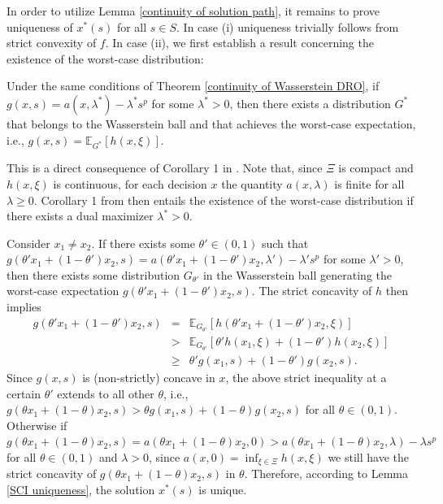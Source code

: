 \documentclass[mnsc,blindrev]{informs4} %
\begin{document}
In order to utilize Lemma \ref{continuity of solution path}, it remains to prove uniqueness of $x^*(s)$ for all $s\in S$. In case (i) uniqueness trivially follows from strict convexity of $f$. In case (ii), we first establish a result concerning the existence of the worst-case distribution:
\begin{lemma}\label{existence of worst-case distribution}
Under the same conditions of Theorem \ref{continuity of Wasserstein DRO}, if $g(x,s)=a(x,\lambda^*)-\lambda^* s^p$ for some $\lambda^*>0$, then there exists a distribution $G^*$ that belongs to the Wasserstein ball and that achieves the worst-case expectation, i.e., $g(x,s)=\mathbb E_{G^*}[h(x,\xi)]$.
\end{lemma}
This is a direct consequence of Corollary 1 in \cite{gao2016distributionally}. Note that, since $\Xi$ is compact and $h(x,\xi)$ is continuous, for each decision $x$ the quantity $a(x,\lambda)$ is finite for all $\lambda\geq 0$. Corollary 1 from \cite{gao2016distributionally} then entails the existence of the worst-case distribution if there exists a dual maximizer $\lambda^*>0$.\hfill\Halmos

Consider $x_1\neq x_2$. If there exists some $\theta'\in (0,1)$ such that $g(\theta' x_1+(1-\theta')x_2,s)= a(\theta' x_1+(1-\theta')x_2,\lambda')-\lambda's^p$ for some $\lambda'>0$, then there exists some distribution $G_{\theta'}$ in the Wasserstein ball generating the worst-case expectation $g(\theta' x_1+(1-\theta')x_2,s)$. The strict concavity of $h$ then implies
\begin{eqnarray*}
g(\theta' x_1+(1-\theta')x_2,s)&=&\mathbb E_{G_{\theta'}}[h(\theta' x_1+(1-\theta')x_2,\xi)]\\
&>&\mathbb E_{G_{\theta'}}[\theta' h(x_1,\xi)+(1-\theta')h(x_2,\xi)]\\
&\geq &\theta'g(x_1,s)+(1-\theta')g(x_2,s).
\end{eqnarray*}
Since $g(x,s)$ is (non-strictly) concave in $x$, the above strict inequality at a certain $\theta'$ extends to all other $\theta$, i.e., $g(\theta x_1+(1-\theta)x_2,s)>\theta g(x_1,s)+(1-\theta) g(x_2,s)$ for all $\theta \in(0,1)$. Otherwise if $g(\theta x_1+(1-\theta)x_2,s)=a(\theta x_1+(1-\theta)x_2,0)>a(\theta x_1+(1-\theta)x_2,\lambda)-\lambda s^p$ for all $\theta\in(0,1)$ and $\lambda >0$, since $a(x,0)=\inf_{\xi\in\Xi}h(x,\xi)$ we still have the strict concavity of $g(\theta x_1+(1-\theta)x_2,s)$ in $\theta$. Therefore, according to Lemma \ref{SCI uniqueness}, the solution $x^*(s)$ is unique.\hfill\Halmos
\end{document}
